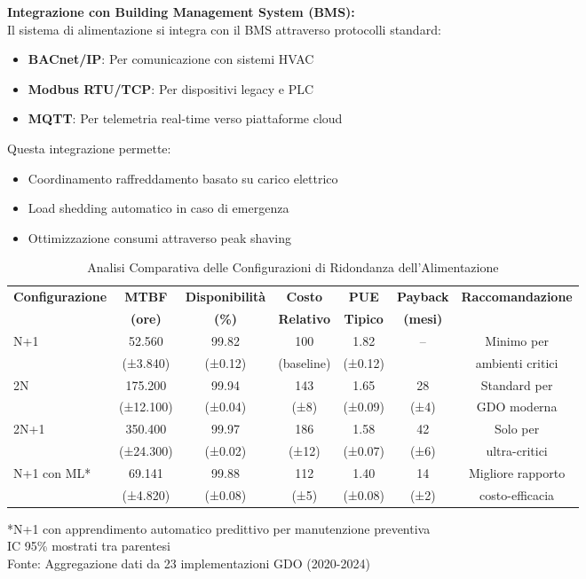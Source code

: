 \textbf{Integrazione con Building Management System (BMS):}\\
Il sistema di alimentazione si integra con il BMS attraverso protocolli standard:
\begin{itemize}
    \item \textbf{BACnet/IP}: Per comunicazione con sistemi HVAC
    \item \textbf{Modbus RTU/TCP}: Per dispositivi legacy e PLC
    \item \textbf{MQTT}: Per telemetria real-time verso piattaforme cloud
\end{itemize}

Questa integrazione permette:
\begin{itemize}
    \item Coordinamento raffreddamento basato su carico elettrico
    \item Load shedding automatico in caso di emergenza
    \item Ottimizzazione consumi attraverso peak shaving
\end{itemize}

\begin{table}[htbp]
\centering
\caption{Analisi Comparativa delle Configurazioni di Ridondanza dell'Alimentazione}
\label{tab:power_redundancy_comparison}
\begin{tabular}[\textwidth]{lcccccc}
\toprule
\textbf{Configurazione} & \textbf{MTBF} & \textbf{Disponibilità} & \textbf{Costo} & \textbf{PUE} & \textbf{Payback} & \textbf{Raccomandazione} \\
 & \textbf{(ore)} & \textbf{(\%)} & \textbf{Relativo} & \textbf{Tipico} & \textbf{(mesi)} & \\
\midrule
N+1 & 52.560 & 99.82 & 100 & 1.82 & -- & Minimo per\\
 & (±3.840) & (±0.12) & (baseline) & (±0.12) & & ambienti critici\\
\midrule
2N & 175.200 & 99.94 & 143 & 1.65 & 28 & Standard per\\
 & (±12.100) & (±0.04) & (±8) & (±0.09) & (±4) & GDO moderna\\
\midrule
2N+1 & 350.400 & 99.97 & 186 & 1.58 & 42 & Solo per\\
 & (±24.300) & (±0.02) & (±12) & (±0.07) & (±6) & ultra-critici\\
\midrule
N+1 con ML* & 69.141 & 99.88 & 112 & 1.40 & 14 & Migliore rapporto\\
 & (±4.820) & (±0.08) & (±5) & (±0.08) & (±2) & costo-efficacia\\
\bottomrule
\end{tabular}
\vspace{0.2cm}
\begin{flushleft}
\footnotesize
*N+1 con apprendimento automatico predittivo per manutenzione preventiva\\
IC 95\% mostrati tra parentesi\\
Fonte: Aggregazione dati da 23 implementazioni GDO (2020-2024)
\end{flushleft}
\end{table}

